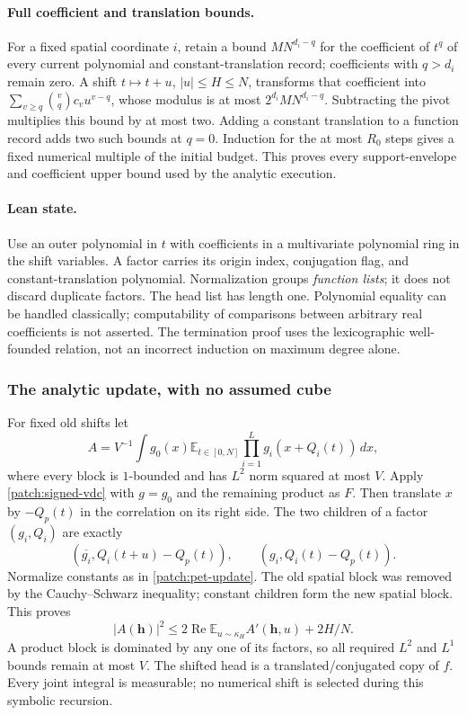 \documentclass[11pt]{article}
\theoremstyle{definition}
\begin{document}
\paragraph{Full coefficient and translation bounds.}
For a fixed spatial coordinate $i$, retain a bound $M N^{d_i-q}$ for the coefficient of
$t^q$ of every current polynomial and constant-translation record; coefficients with
$q>d_i$ remain zero.  A shift $t\mapsto t+u$, $|u|\leq H\leq N$, transforms that
coefficient into $\sum_{v\geq q}\binom vq c_v u^{v-q}$, whose modulus is at most
$2^{d_i}M N^{d_i-q}$.  Subtracting the pivot multiplies this bound by at most two.
Adding a constant translation to a function record adds two such bounds at $q=0$.
Induction for the at most $R_0$ steps gives a fixed numerical multiple of the initial budget.
This proves every support-envelope and coefficient upper bound used by the analytic execution.

\paragraph{Lean state.}
Use an outer polynomial in $t$ with coefficients in a multivariate polynomial ring in the
shift variables.  A factor carries its origin index, conjugation flag, and constant-translation
polynomial.  Normalization groups \emph{function lists}; it does not discard duplicate factors.
The head list has length one.  Polynomial equality can be handled classically; computability
of comparisons between arbitrary real coefficients is not asserted.  The termination proof
uses the lexicographic well-founded relation, not an incorrect induction on maximum degree alone.

\subsubsection{The analytic update, with no assumed cube}
For fixed old shifts let
\[
 A=V^{-1}\int g_0(x)\mathbb E_{t\in[0,N]}
                   \prod_{i=1}^L g_i(x+Q_i(t))\,dx,
\]
where every block is $1$-bounded and has $L^2$ norm squared at most $V$.
Apply \cref{patch:signed-vdc} with $g=g_0$ and the remaining product as $F$.
Then translate $x$ by $-Q_p(t)$ in the correlation on its right side.
The two children of a factor $(g_i,Q_i)$ are exactly
\[
 (\overline{g_i},Q_i(t+u)-Q_p(t)),\qquad(g_i,Q_i(t)-Q_p(t)).
\]
Normalize constants as in \cref{patch:pet-update}.  The old spatial block was removed by the
Cauchy--Schwarz inequality; constant children form the new spatial block.  This proves
\[
 \label{patch:pet-analytic-step}
 |A(\mathbf h)|^2\leq2\operatorname{Re}\mathbb E_{u\sim\kappa_H}
                       A'(\mathbf h,u)+2H/N.
 \tag{\theequation}
\]
A product block is dominated by any one of its factors, so all required $L^2$ and $L^1$
bounds remain at most $V$.  The shifted head is a translated/conjugated copy of $f$.
Every joint integral is measurable; no numerical shift is selected during this symbolic recursion.
\end{document}
